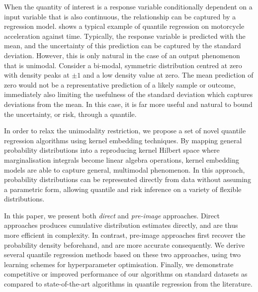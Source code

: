 \documentclass[twoside]{article} \usepackage{aistats2017}
\theoremstyle{definition}
\theoremstyle{theorem}
\begin{document}
	When the quantity of interest is a response variable conditionally dependent on a input variable that is also continuous, the relationship can be captured by a regression model.  shows a typical example of quantile regression on motorcycle acceleration against time. Typically, the response variable is predicted with the mean, and the uncertainty of this prediction can be captured by the standard deviation. However, this is only natural in the case of an output phenomenon that is unimodal. Consider a bi-modal, symmetric distribution centred at zero with density peaks at $\pm1$ and a low density value at zero. The mean prediction of zero would not be a representative prediction of a likely sample or outcome, immediately also limiting the usefulness of the standard deviation which captures deviations from the mean. In this case, it is far more useful and natural to bound the uncertainty, or risk, through a quantile.
	
%
	

	In order to relax the unimodality restriction, we propose a set of novel quantile regression algorithms using kernel embedding techniques. By mapping general probability distributions into a reproducing kernel Hilbert space where marginalisation integrals become linear algebra operations, kernel embedding models are able to capture general, multimodal phenomenon. In this approach, probability distributions can be represented directly from data without assuming a parametric form, allowing quantile and risk inference on a variety of flexible distributions.
	
	In this paper, we present both \textit{direct} and \textit{pre-image} approaches. Direct approaches produces cumulative distribution estimates directly, and are thus more efficient in complexity. In contrast, pre-image approaches first recover the probability density beforehand, and are more accurate consequently. We derive several quantile regression methods based on these two approaches, using two learning schemes for hyperparameter optimisation. Finally, we demonstrate competitive or improved performance of our algorithms on standard datasets as compared to state-of-the-art algorithms in quantile regression from the literature.
\end{document}
